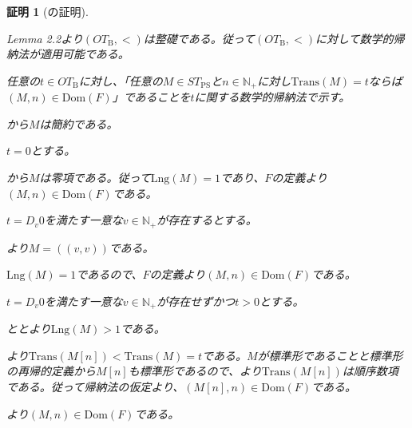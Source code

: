 \documentclass[dvipdfmx,uplatex]{jsarticle}
\theoremstyle{customnonumberbreakfortheorem}
\theoremstyle{customnonumberbreakforproof}
\newtheorem{hideableproof}{証明}
\begin{document}
\begin{hideableproof}[の証明]
	\begin{indented}
		\item \cite{buc1} Lemma 2.2より\((OT_{\textrm{B}},<)\)は整礎である。従って\((OT_{\textrm{B}},<)\)に対して数学的帰納法が適用可能である。
		\item 任意の\(t \in OT_{\textrm{B}}\)に対し、「任意の\(M \in ST_{\textrm{PS}}\)と\(n \in \mathbb{N}_{+}\)に対し\(\textrm{Trans}(M) = t\)ならば\((M,n) \in \textrm{Dom}(F)\)」であることを\(t\)に関する数学的帰納法で示す。
		\item {}から\(M\)は簡約である。
		\item \(t = 0\)とする。
		\begin{indented}
			\item {}から\(M\)は零項である。従って\(\textrm{Lng}(M) = 1\)であり、\(F\)の定義より\((M,n) \in \textrm{Dom}(F)\)である。
		\end{indented}
		\item \(t = D_v 0\)を満たす一意な\(v \in \mathbb{N}_{+}\)が存在するとする。
		\begin{indented}
			\item {}より\(M = ((v,v))\)である。
			\item \(\textrm{Lng}(M) = 1\)であるので、\(F\)の定義より\((M,n) \in \textrm{Dom}(F)\)である。
		\end{indented}
		\item \(t = D_v 0\)を満たす一意な\(v \in \mathbb{N}_{+}\)が存在せずかつ\(t > 0\)とする。
		\begin{indented}
			\item {}ととより\(\textrm{Lng}(M) > 1\)である。
			\item {}より\(\textrm{Trans}(M[n]) < \textrm{Trans}(M) = t\)である。\(M\)が標準形であることと標準形の再帰的定義から\(M[n]\)も標準形であるので、より\(\textrm{Trans}(M[n])\)は順序数項である。従って帰納法の仮定より、\((M[n],n) \in \textrm{Dom}(F)\)である。
			\item {}より\((M,n) \in \textrm{Dom}(F)\)である。
		\end{indented}
	\end{indented}
\end{hideableproof}
\end{document}

